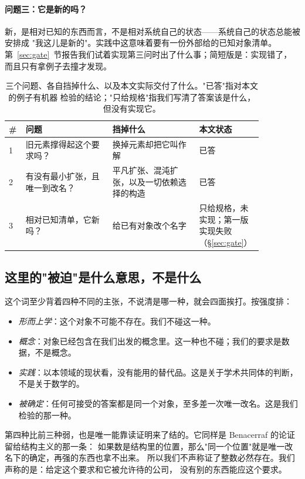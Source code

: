 \documentclass[aps,prd,preprint,superscriptaddress,amsmath,amssymb]{revtex4-2}
\begin{document}
\paragraph{问题三：它是新的吗？}
新，是相对已知的东西而言，不是相对系统自己的状态——系统自己的状态总能被安排成
"我这儿是新的"。实践中这意味着要有一份外部给的已知对象清单。
第~\ref{sec:gate}~节报告我们试着实现第三问时出了什么事；简短版是：实现错了，
而且只有拿例子去撞才发现。

\begin{table}[t]
\caption{三个问题、各自挡掉什么、以及本文实际交付了什么。"已答"指对本文的例子有机器
检验的结论；"只给规格"指我们写清了答案该是什么，但没有实现它。}
\label{tab:three}
\begin{ruledtabular}
\begin{tabular}{p{0.05\linewidth}p{0.32\linewidth}p{0.32\linewidth}p{0.17\linewidth}}
\# & 问题 & 挡掉什么 & 本文状态 \\
\hline
1 & 旧元素撑得起这个要求吗？ & 换掉元素却把它叫作解 & 已答 \\
2 & 有没有最小扩张，且唯一到改名？ & 平凡扩张、混沌扩张，以及一切依赖选择的构造 & 已答 \\
3 & 相对已知清单，它新吗？ & 给已有对象改个名字 & 只给规格，未实现；第一版实现失败（\S\ref{sec:gate}） \\
\end{tabular}
\end{ruledtabular}
\end{table}

\subsection*{这里的"被迫"是什么意思，不是什么}

这个词至少背着四种不同的主张，不说清是哪一种，就会四面挨打。按强度排：

\begin{itemize}
\item \emph{形而上学}：这个对象不可能不存在。我们不碰这一种。
\item \emph{概念}：对象已经包含在我们出发的概念里。这一种也不碰；我们的要求是数据，不是概念。
\item \emph{实践}：以本领域的现状看，没有能用的替代品。这是关于学术共同体的判断，不是关于数学的。
\item \emph{被确定}：任何可接受的答案都是同一个对象，至多差一次唯一改名。这是我们检验的那一种。
\end{itemize}

第四种比前三种弱，也是唯一能靠读证明来了结的。它同样是 Benacerraf 的论证留给结构主义的那一条：
如果数是结构里的位置，那么"同一个位置"就是唯一改名下的确定，再强的东西也拿不出来。
所以我们不声称证了整数必然存在。我们声称的是：给定这个要求和它被允许待的公司，
没有别的东西能应这个要求。
\end{document}
